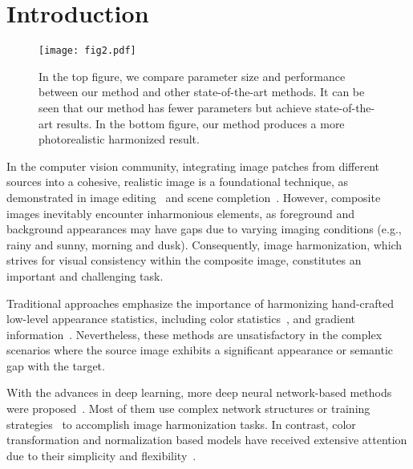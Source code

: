 \documentclass[sigconf]{acmart}
\begin{document}







\maketitle

\section{Introduction}

\begin{figure}[t]
	\centering
	\texttt{[image: fig2.pdf]}
	\caption{In the top figure, we compare parameter size and performance between our method and other state-of-the-art methods. It can be seen that our method has fewer parameters but achieve state-of-the-art results. In the bottom figure, our method produces a more photorealistic harmonized result.}
	\label{hdih}
\end{figure}

In the computer vision community, integrating image patches from different sources into a cohesive, realistic image is a foundational technique, as demonstrated in image editing~\cite{shi2022spaceedit,ling2021editgan} and scene completion~\cite{cai2021semantic,tang2022not}. However, composite images inevitably encounter inharmonious elements, as foreground and background appearances may have gaps due to varying imaging conditions (e.g., rainy and sunny, morning and dusk). Consequently, image harmonization, which strives for visual consistency within the composite image, constitutes an important and challenging task.

Traditional approaches emphasize the importance of harmonizing hand-crafted low-level appearance statistics, including color statistics~\cite{CT,xue2012TG}, and gradient information~\cite{Mat2016}. Nevertheless, these methods are unsatisfactory in the complex scenarios where the source image exhibits a significant appearance or semantic gap with the target.

With the advances in deep learning, more deep neural network-based methods were proposed~\cite{DoveNet,Bargainnet,Harmonizer,CDTNet}. Most of them use complex network structures or training strategies~\cite{Bargainnet,DoveNet} to accomplish image harmonization tasks. In contrast, color transformation and normalization based models have received extensive attention due to their simplicity and flexibility~\cite{RAIN,CDTNet,liang2021spatial}. 
\end{document}
